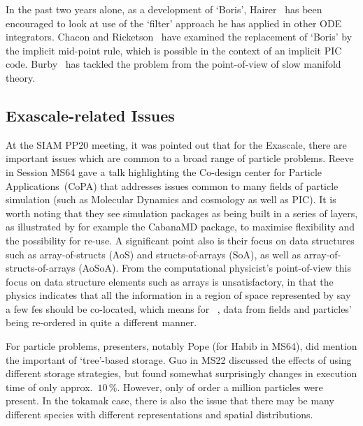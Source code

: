 In the past two years alone, as a development of `Boris', Hairer~\cite{Ha19filt} has been
encouraged to look at use of the `filter' approach he has applied in other ODE integrators.
Chacon and Ricketson~\cite{Ri19ener} have examined the replacement of `Boris' by the implicit mid-point
rule, which is possible in the context of an implicit PIC code.
Burby~\cite{Bu20guid} has tackled the problem from the point-of-view of slow manifold theory.

\subsection{Exascale-related Issues} \label{sec:exasc}
At the SIAM PP20 meeting, it was pointed out that
for the Exascale, there are important issues which are common to
a broad range of particle problems. Reeve in Session MS64 gave a talk highlighting the Co-design center for Particle
Applications~(CoPA) that addresses issues common to many fields of particle simulation (such
as Molecular Dynamics and cosmology as well as PIC). It is worth noting that they see simulation
packages as being built in a series of layers, as illustrated by for example the CabanaMD package,
to maximise flexibility and the possibility for re-use. A significant point also is their
focus on data structures such as array-of-structs (AoS) and structs-of-arrays (SoA), as well
as array-of-structs-of-arrays (AoSoA). From the computational physicist's point-of-view this
focus on data structure elements such as arrays is unsatisfactory, in that the physics indicates that all the
information in a region of space represented by say a few fes should be co-located, which 
means for \nep \ , data from fields and particles' being re-ordered in quite a different manner.


For particle problems, presenters, notably Pope (for Habib in MS64), did mention the important of `tree'-based storage.
Guo in MS22 discussed the effects of using different storage strategies, but found  somewhat surprisingly 
changes in execution time of only approx.~$10$\,\%. However,
only of order a million particles were present. In the tokamak case, there is
also the issue that there may be many different species with different 
representations and spatial distributions.
